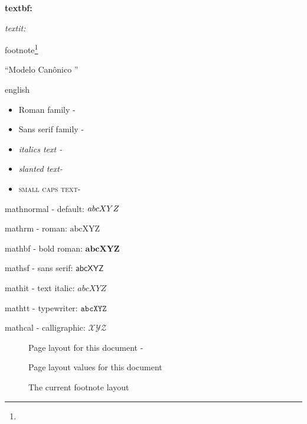 \sloppy
\textbf{textbf: \showfont}
\fussy

\textit{textit: \showfont}

footnote\footnote{\showfont}


``Modelo Canônico \showfont''

\begin{otherlanguage*}{english}
\begin{itemize}
    \item \textrm{Roman family - \showfont }
    \item \textsf{Sans serif family - \showfont}
    \item \textit{italics text - \showfont}
    \item \textsl{slanted text- \showfont}
    \item \textsc{small caps text- \showfont}
\end{itemize}
\end{otherlanguage*}




mathnormal -  default: $\mathnormal{abcXYZ}$

mathrm - roman: $\mathrm{abcXYZ}$

mathbf - bold roman: $\mathbf{abcXYZ}$

mathsf - sans serif: $\mathsf{abcXYZ}$

mathit - text italic: $\mathit{abcXYZ}$

mathtt -  typewriter: $\mathtt{abcXYZ}$

mathcal - calligraphic: $\mathcal{XYZ}$



\begin{figure}
    \caption{Page layout for this document -  \showfont} \label{fig:ptrs}
\end{figure}


\begin{figure}
    \caption{Page layout values for this document} \label{fig:ptrsval}

\end{figure}



\begin{figure}
    \caption{The current footnote layout}\label{fig:ftry}
\end{figure}


